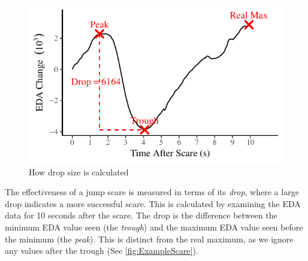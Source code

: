 \documentclass[12pt,a4paper]{article}\usepackage[]{graphicx}\usepackage[]{color}
\makeatletter
\def\maxwidth{ %
  \ifdim\Gin@nat@width>\linewidth
    \linewidth
  \else
    \Gin@nat@width
  \fi
}
\makeatother
\begin{document}
\begin{figure}
	\vspace{-30pt}


{\centering \includegraphics[width=\maxwidth]{figure/ExampleScare-1} 

}



	\caption{How drop size is calculated}
	\label{fig:ExampleScare}
\end{figure}

The effectiveness of a jump scare is measured in terms of its \emph{drop}, where a large drop indicates a more successful scare.
This is calculated by examining the EDA data for 10 seconds after the scare.
The drop is the difference between the minimum EDA value seen (the \emph{trough}) and the maximum EDA value seen before the minimum (the \emph{peak}).
This is distinct from the real maximum, as we ignore any values after the trough (See \vref{fig:ExampleScare}).

\vspace{20pt}
\end{document}
